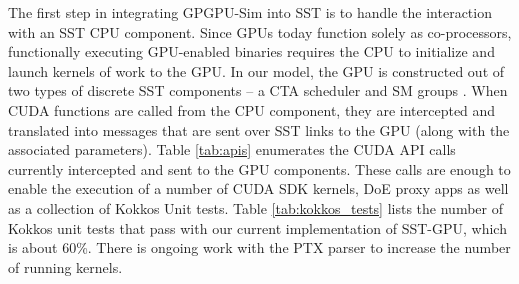 The first step in integrating GPGPU-Sim into SST is to handle the interaction
with an SST CPU component. Since GPUs today function solely as co-processors,
functionally executing GPU-enabled binaries requires the CPU to initialize and
launch kernels of work to the GPU. In our model, the GPU is constructed out of
two types of discrete SST components -- a CTA scheduler and SM groups \cite{v100}.
When CUDA functions are called from the CPU component, they are intercepted and translated
into messages that are sent over SST links to the GPU (along with the associated
parameters). Table \ref{tab:apis} enumerates the CUDA API calls currently intercepted
and sent to the GPU components. These calls are enough to enable the execution of
a number of CUDA SDK kernels, DoE proxy apps as well as a collection of Kokkos Unit
tests. Table \ref{tab:kokkos_tests} lists the number of Kokkos unit tests that
pass with our current implementation of SST-GPU, which is about 60\%. There is
ongoing work with the PTX parser to increase the number of running kernels.


